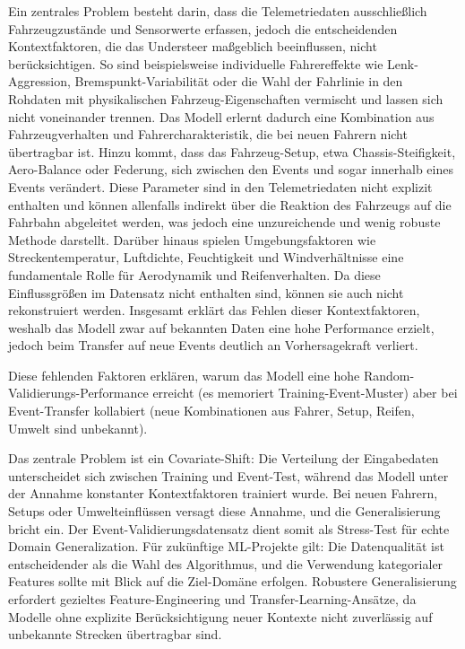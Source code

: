 Ein zentrales Problem besteht darin, dass die Telemetriedaten ausschließlich Fahrzeugzustände und Sensorwerte erfassen, jedoch die entscheidenden Kontextfaktoren, die das Understeer maßgeblich beeinflussen, nicht berücksichtigen. So sind beispielsweise individuelle Fahrereffekte wie Lenk-Aggression, Bremspunkt-Variabilität oder die Wahl der Fahrlinie in den Rohdaten mit physikalischen Fahrzeug-Eigenschaften vermischt und lassen sich nicht voneinander trennen. Das Modell erlernt dadurch eine Kombination aus Fahrzeugverhalten und Fahrercharakteristik, die bei neuen Fahrern nicht übertragbar ist. Hinzu kommt, dass das Fahrzeug-Setup, etwa Chassis-Steifigkeit, Aero-Balance oder Federung, sich zwischen den Events und sogar innerhalb eines Events verändert. Diese Parameter sind in den Telemetriedaten nicht explizit enthalten und können allenfalls indirekt über die Reaktion des Fahrzeugs auf die Fahrbahn abgeleitet werden, was jedoch eine unzureichende und wenig robuste Methode darstellt. Darüber hinaus spielen Umgebungsfaktoren wie Streckentemperatur, Luftdichte, Feuchtigkeit und Windverhältnisse eine fundamentale Rolle für Aerodynamik und Reifenverhalten. Da diese Einflussgrößen im Datensatz nicht enthalten sind, können sie auch nicht rekonstruiert werden. Insgesamt erklärt das Fehlen dieser Kontextfaktoren, weshalb das Modell zwar auf bekannten Daten eine hohe Performance erzielt, jedoch beim Transfer auf neue Events deutlich an Vorhersagekraft verliert.

Diese fehlenden Faktoren erklären, warum das Modell eine hohe Random-Validierungs-Performance erreicht (es memoriert Training-Event-Muster) aber bei Event-Transfer kollabiert (neue Kombinationen aus Fahrer, Setup, Reifen, Umwelt sind unbekannt).

Das zentrale Problem ist ein Covariate-Shift: Die Verteilung der Eingabedaten unterscheidet sich zwischen Training und Event-Test, während das Modell unter der Annahme konstanter Kontextfaktoren trainiert wurde. Bei neuen Fahrern, Setups oder Umwelteinflüssen versagt diese Annahme, und die Generalisierung bricht ein. Der Event-Validierungsdatensatz dient somit als Stress-Test für echte Domain Generalization. Für zukünftige \ac{ML}-Projekte gilt: Die Datenqualität ist entscheidender als die Wahl des Algorithmus, und die Verwendung kategorialer Features sollte mit Blick auf die Ziel-Domäne erfolgen. Robustere Generalisierung erfordert gezieltes Feature-Engineering und Transfer-Learning-Ansätze, da Modelle ohne explizite Berücksichtigung neuer Kontexte nicht zuverlässig auf unbekannte Strecken übertragbar sind.
